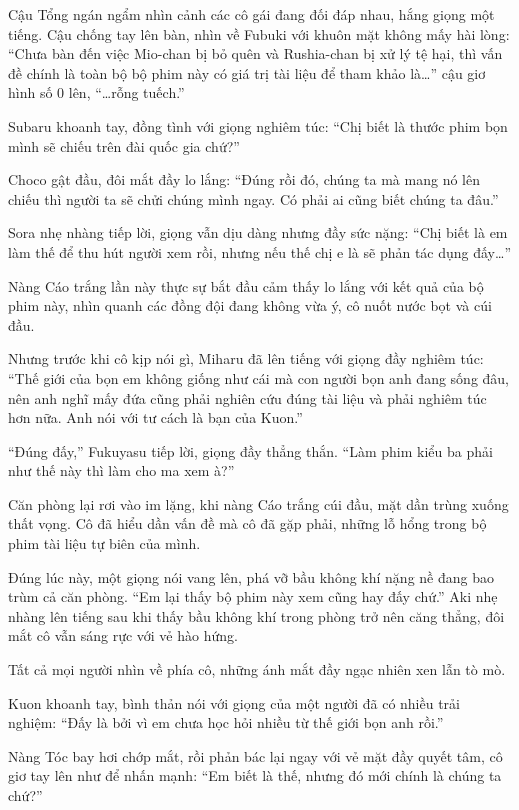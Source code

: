 \documentclass[../main.tex]{subfiles}
\begin{document}
Cậu Tổng ngán ngẩm nhìn cảnh các cô gái đang đối đáp nhau, hắng giọng một tiếng. Cậu chống tay lên bàn, nhìn về Fubuki với khuôn mặt không mấy hài lòng: ``Chưa bàn đến việc Mio-chan bị bỏ quên và Rushia-chan bị xử lý tệ hại, thì vấn đề chính là toàn bộ bộ phim này có giá trị tài liệu để tham khảo là\dots'' cậu giơ hình số 0 lên, ``\dots rỗng tuếch.''

Subaru khoanh tay, đồng tình với giọng nghiêm túc: ``Chị biết là thước phim bọn mình sẽ chiếu trên đài quốc gia chứ?''

Choco gật đầu, đôi mắt đầy lo lắng: ``Đúng rồi đó, chúng ta mà mang nó lên chiếu thì người ta sẽ chửi chúng mình ngay. Có phải ai cũng biết chúng ta đâu.''

Sora nhẹ nhàng tiếp lời, giọng vẫn dịu dàng nhưng đầy sức nặng: ``Chị biết là em làm thế để thu hút người xem rồi, nhưng nếu thế chị e là sẽ phản tác dụng đấy\dots''

Nàng Cáo trắng lần này thực sự bắt đầu cảm thấy lo lắng với kết quả của bộ phim này, nhìn quanh các đồng đội đang không vừa ý, cô nuốt nước bọt và cúi đầu.

Nhưng trước khi cô kịp nói gì, Miharu đã lên tiếng với giọng đầy nghiêm túc: ``Thế giới của bọn em không giống như cái mà con người bọn anh đang sống đâu, nên anh nghĩ mấy đứa cũng phải nghiên cứu đúng tài liệu và phải nghiêm túc hơn nữa. Anh nói với tư cách là bạn của Kuon.''

``Đúng đấy,'' Fukuyasu tiếp lời, giọng đầy thẳng thắn. ``Làm phim kiểu ba phải như thế này thì làm cho ma xem à?''

Căn phòng lại rơi vào im lặng, khi nàng Cáo trắng cúi đầu, mặt dần trùng xuống thất vọng. Cô đã hiểu dần vấn đề mà cô đã gặp phải, những lỗ hổng trong bộ phim tài liệu tự biên của mình.

Đúng lúc này, một giọng nói vang lên, phá vỡ bầu không khí nặng nề đang bao trùm cả căn phòng. ``Em lại thấy bộ phim này xem cũng hay đấy chứ.'' Aki nhẹ nhàng lên tiếng sau khi thấy bầu không khí trong phòng trở nên căng thẳng, đôi mắt cô vẫn sáng rực với vẻ hào hứng.

Tất cả mọi người nhìn về phía cô, những ánh mắt đầy ngạc nhiên xen lẫn tò mò.

Kuon khoanh tay, bình thản nói với giọng của một người đã có nhiều trải nghiệm: ``Đấy là bởi vì em chưa học hỏi nhiều từ thế giới bọn anh rồi.''

Nàng Tóc bay hơi chớp mắt, rồi phản bác lại ngay với vẻ mặt đầy quyết tâm, cô giơ tay lên như để nhấn mạnh: ``Em biết là thế, nhưng đó mới chính là chúng ta chứ?''
\end{document}
